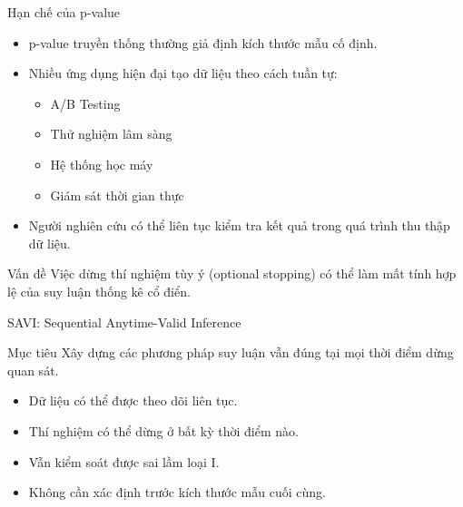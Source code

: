 \begin{frame}{Hạn chế của p-value}

\begin{itemize}

\item p-value truyền thống thường giả định kích thước mẫu cố định.

\item Nhiều ứng dụng hiện đại tạo dữ liệu theo cách tuần tự:
\begin{itemize}
    \item A/B Testing
    \item Thử nghiệm lâm sàng
    \item Hệ thống học máy
    \item Giám sát thời gian thực
\end{itemize}

\item Người nghiên cứu có thể liên tục kiểm tra kết quả trong quá trình thu thập dữ liệu.

\end{itemize}

\begin{alertblock}{Vấn đề}
Việc dừng thí nghiệm tùy ý (optional stopping) có thể làm mất tính hợp lệ của suy luận thống kê cổ điển.
\end{alertblock}

\end{frame}

\begin{frame}{SAVI: Sequential Anytime-Valid Inference}

\begin{block}{Mục tiêu}
Xây dựng các phương pháp suy luận vẫn đúng tại mọi thời điểm dừng quan sát.
\end{block}

\begin{itemize}
\item Dữ liệu có thể được theo dõi liên tục.
\item Thí nghiệm có thể dừng ở bất kỳ thời điểm nào.
\item Vẫn kiểm soát được sai lầm loại I.
\item Không cần xác định trước kích thước mẫu cuối cùng.
\end{itemize}

\end{frame}

